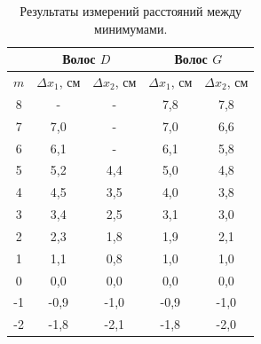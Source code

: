 \documentclass[a4paper,12pt]{article} %
\begin{document}
	\begin{table}[H]
	\caption{Результаты измерений расстояний между минимумами.}
	\label{table:exp}
	\begin{tabular}{|c|c|c|c|c|}
		\hline
		& \multicolumn{2}{c|}{Волос $D$}                         & \multicolumn{2}{c|}{Волос $G$}                                              \\ \hline
		$m$  & $\Delta x_1$, см & \multicolumn{1}{l|}{$\Delta x_2$, см} & \multicolumn{1}{l|}{$\Delta x_1$, см} & \multicolumn{1}{l|}{$\Delta x_2$, см} \\ \hline
		8  & -                & -                                     & 7,8                                   & 7,8                                   \\ \hline
		7  & 7,0              & -                                     & 7,0                                   & 6,6                                   \\ \hline
		6  & 6,1              & -                                     & 6,1                                   & 5,8                                   \\ \hline
		5  & 5,2              & 4,4                                   & 5,0                                   & 4,8                                   \\ \hline
		4  & 4,5              & 3,5                                   & 4,0                                   & 3,8                                   \\ \hline
		3  & 3,4              & 2,5                                   & 3,1                                   & 3,0                                   \\ \hline
		2  & 2,3              & 1,8                                   & 1,9                                   & 2,1                                   \\ \hline
		1  & 1,1              & 0,8                                   & 1,0                                   & 1,0                                   \\ \hline
		0  & 0,0              & 0,0                                   & 0,0                                   & 0,0                                   \\ \hline
		-1 & -0,9             & -1,0                                  & -0,9                                  & -1,0                                  \\ \hline
		-2 & -1,8             & -2,1                                  & -1,8                                  & -2,0                                  \\ \hline

\end{tabular}
\end{table}
\end{document}
